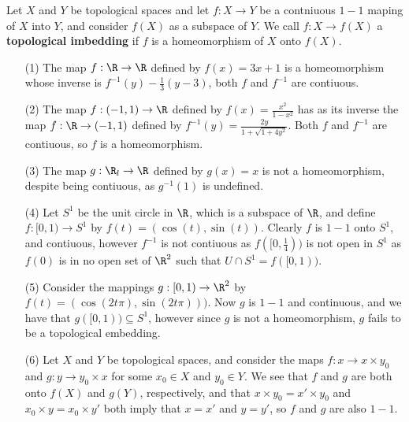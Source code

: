 \begin{definition}
    Let $X$ and  $Y$ be topological spaces and let  $f:X \rightarrow Y$ be a
    contniuous  $1-1$ maping
    of  $X$ into  $Y$, and consider  $f(X)$ as a subspace of $Y$. We call  $f:X \rightarrow f(X)$ a
    \textbf{topological imbedding} if $f$ is a homeomorphism of $X$ onto  $f(X)$.
\end{definition}

\begin{example}
    \begin{enumerate}
        \item[(1)] The map $f:\R \rightarrow \R$ defined by  $f(x)=3x+1$ is a
            homeomorphism whose inverse is $f^{-1}(y)-\frac{1}{3}(y-3)$, both
            $f$ and  $f^{-1}$ are contiuous.

        \item[(2)] The map $f:(-1,1) \rightarrow \R$ defined by $f(x)=
            \frac{x^2}{1-x^2}$ has as its inverse the map $f:\R \rightarrow
            (-1,1)$ defined by $f^{-1}(y)=\frac{2y}{1+\sqrt{1+4y^2}}$. Both $f$
            and  $f^{-1}$ are contiuous, so $f$ is a homeomorphism.

        \item[(3)] The map  $g:\R_l \rightarrow \R$ defined by  $g(x)=x$ is not
            a homeomorphism, despite being contiuous, as $g^{-1}(1)$ is undefined.

        \item[(4)] Let $S^1$ be the unit circle in $\R$, which is a subspace
            of $\R$, and define $f:[0,1) \rightarrow S^1$ by
            $f(t)=(\cos(t),\sin(t))$. Clearly $f$ is  $1-1$ onto $S^1$, and
            contiuous, however  $f^{-1}$ is not contiuous as $f([0,\frac{1}{4}))$
            is not open in $S^1$ as  $f(0)$ is in no open set of $\R^2$ such
            that  $U \cap S^1=f([0,1))$.

        \item[(5)] Consider the mappings $g:[0,1) \rightarrow \R^2$ by
            $f(t)=(\cos(2t\pi),\sin(2t\pi)))$. Now $g$ is  $1-1$ and continuous,
            and we have that  $g([0,1)) \subseteq S^1$, however since $g$ is not
            a homeomorphism,  $g$ fails to be a topological embedding.

        \item[(6)] Let $X$ and  $Y$ be topological spaces, and consider the maps
             $f:x \rightarrow x \times y_0$ and $g:y \rightarrow y_0 \times x$
             for some $x_0 \in X$ and $y_0 \in Y$. We see that $f$ and  $g$ are
             both onto $f(X)$ and $g(Y)$, respectively, and that $x \times
             y_0=x' \times y_0$ and $x_0 \times y=x_0 \times y'$ both imply that
             $x=x'$ and  $y=y'$, so  $f$ and  $g$ are also  $1-1$.


\end{enumerate}
\end{example}
